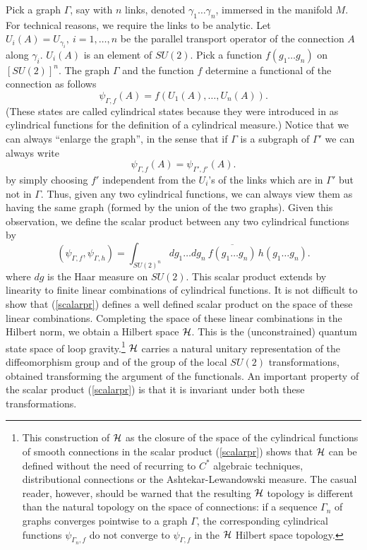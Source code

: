 \documentclass[12pt]{article}
\begin{document}
Pick a graph $\Gamma$, say with $n$ links, denoted 
$\gamma_{1}\ldots\gamma_{n}$, immersed in the manifold $M$.  For 
technical reasons, we require the links to be analytic.  Let 
$U_{i}(A)=U_{\gamma_{i}}, \ i=1,\ldots, n$ be the parallel transport 
operator of the connection $A$ along $\gamma_{i}$.  $U_{i}(A)$ is an 
element of $SU(2)$.  Pick a function $f(g_{1}\ldots g_{n})$ on 
$[SU(2)]^{n}$.  The graph $\Gamma$ and the function $f$ determine a 
functional of the connection as follows
\begin{equation}
	\psi_{\Gamma,f}(A)=f(U_{1}(A),\ldots, U_{n}(A)). 
\end{equation}
(These states are called cylindrical states because they were 
introduced in 
\cite{AshtekarLewandowski,AshtekarLewandowski3,%
AshtekarLewandowski2} as cylindrical functions 
for the definition of a cylindrical measure.)  Notice that we can 
always ``enlarge the graph'', in the sense that if $\Gamma$ is a 
subgraph of $\Gamma'$ we can always write
\begin{equation}
	\psi_{\Gamma,f}(A)=	\psi_{\Gamma',f'}(A). 
	\label{prmap}
\end{equation}
by simply choosing $f'$ independent from the $U_{i}$'s of the 
links which are in $\Gamma'$ but not in $\Gamma$.  Thus, given 
any two cylindrical functions, we can always view them as having 
the same graph (formed by the union of the two graphs).  Given this 
observation, we define the scalar product between any two 
cylindrical functions
 \cite{JerzyGraph,AshtekarLewandowski,AshtekarLewandowski3,%
 AshtekarLewandowski2} by
\begin{equation}
	(\psi_{\Gamma,f}, \psi_{\Gamma,h}) = \int _{SU(2)^{n}} 
	\!\!\! dg_{1}\ldots dg_{n} \  
	\overline{f(g_{1}\ldots g_{n})}\, 
	h(g_{1}\ldots g_{n}).
\label{scalarpr}
\end{equation}
where $dg$ is the Haar measure on $SU(2)$.  This scalar product 
extends by linearity to finite linear combinations of cylindrical 
functions.  It is not difficult to show that (\ref{scalarpr}) 
defines a well defined scalar product on the space of these 
linear combinations.  Completing the space of these linear 
combinations in the Hilbert norm, we obtain a Hilbert space $\cal 
H$.  This is the (unconstrained) quantum state space of loop 
gravity.\footnote{This construction of $\cal H$ as the closure 
of the space of the cylindrical functions of smooth connections
in the scalar product (\ref{scalarpr}) shows that $\cal H$ can
be defined without the need of recurring to $C^{*}$ algebraic 
techniques, distributional connections or the Ashtekar-Lewandowski 
measure. The casual reader, however, should be warned that 
the resulting $\cal H$ topology is different than the natural 
topology on the space of connections: if a sequence $\Gamma_{n}$ of 
graphs converges pointwise to a graph $\Gamma$, the corresponding
cylindrical functions $\psi_{\Gamma_{n},f}$ do not converge to 
$\psi_{\Gamma,f}$ in the $\cal H$ Hilbert space topology.}
$\cal H$ carries a natural unitary representation of the 
diffeomorphism group and of the group of the local $SU(2)$ 
transformations, obtained transforming the argument of the 
functionals.  An important property of the scalar product 
(\ref{scalarpr}) is that it is invariant under both these 
transformations.
\end{document}
